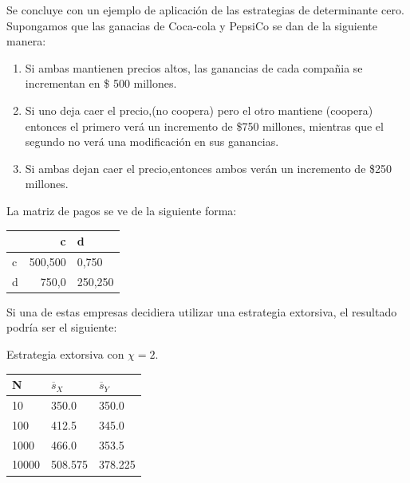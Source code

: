 \documentclass[12pt]{article}
\begin{document}
Se concluye con un ejemplo de aplicación de las estrategias de determinante cero.
Supongamos que las ganacias de Coca-cola y PepsiCo se dan de la siguiente manera:
\begin{enumerate}
 \item Si ambas mantienen precios altos, las ganancias de cada compañia se incrementan
 en \$ 500 millones. 
 \item Si uno deja caer el precio,(no coopera) pero el otro mantiene (coopera) entonces 
 el primero verá un incremento de \$750 millones, mientras que el segundo no verá una modificación en sus ganancias.
 \item Si ambas dejan caer el precio,entonces ambos verán un incremento de \$250 millones.
\end{enumerate}
 
La matriz de pagos se ve de la siguiente forma:

\begin{tabular}{|l|r| l|}
  \hline   
     & c & d \\\hline
   c & 500,500 & 0,750 \\ \hline
   d & 750,0 & 250,250 \\  \hline  
\end{tabular} 

Si una de estas empresas decidiera utilizar una estrategia extorsiva, el resultado podría ser el
siguiente:

Estrategia extorsiva con $\chi=2$. 
\begin{center}
  \begin{tabular}{| l | l | l |}
    \hline
    N & $\overline s_X$ & $\overline s_Y$ \\\hline
    10 & 350.0 &350.0 \\\hline
    100 & 412.5 & 345.0 \\\hline
    1000 & 466.0 & 353.5 \\\hline
    10000 & 508.575 & 378.225 \\\hline    
  \end{tabular}
\end{center}
\end{document}
